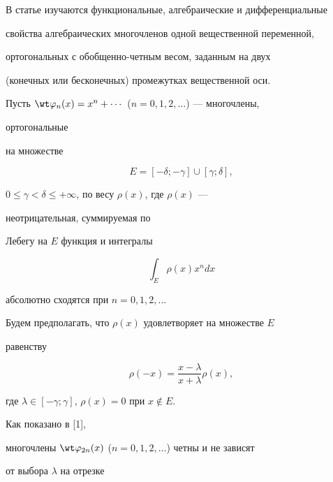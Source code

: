 \label{begin} 


 


В статье изучаются функциональные, алгебраические и дифференциальные 


свойства алгебраических многочленов одной вещественной переменной, 


ортогональных с обобщенно-четным весом, заданным на двух 


(конечных или бесконечных) промежутках вещественной оси. 


 


Пусть $\wt\varphi_n(x)=x^n+\dotsb$ ($n=0,1,2,\dotsc$) --- многочлены, 


ортогональные 


на множестве 


\begin{equation} 


E=[-\delta;-\gamma]\cup[\gamma;\delta], 


\end{equation} 


$0\le\gamma<\delta\le+\infty$, по весу $\rho(x)$, где $\rho(x)$ --- 


неотрицательная, суммируемая по 


Лебегу на $E$ функция и интегралы 


$$ 


\int_E \rho(x)x^n dx 


$$ 


абсолютно сходятся при $n=0,1,2,\dotsc$ 


 


Будем предполагать, что $\rho(x)$ удовлетворяет на множестве $E$ 


равенству 


\begin{equation} 


\rho(-x)=\frac{x-\lambda}{x+\lambda}\rho(x), 


\end{equation} 


где $\lambda\in[-\gamma;\gamma]$, $\rho(x)=0$ при $x\notin E$. 


 


Как показано в [1], 


многочлены $\wt\varphi_{2n}(x)$ ($n=0,1,2,\dotsc$) четны и не зависят 


от выбора $\lambda$ на отрезке 


